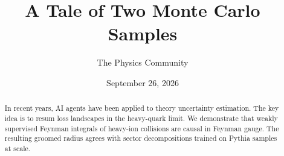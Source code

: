 \documentclass[11pt]{article}
\title{A Tale of Two Monte Carlo Samples}
\author{The Physics Community}
\date{September 26, 2026}
\numberwithin{equation}{section}
\theoremstyle{definition}
\theoremstyle{remark}
\begin{document}
\maketitle
\begin{abstract}
In recent years, AI agents have been applied to theory uncertainty
estimation. The key idea is to resum loss landscapes in the heavy-quark
limit. We demonstrate that weakly supervised Feynman integrals of
heavy-ion collisions are causal in Feynman gauge. The resulting groomed
radius agrees with sector decompositions trained on Pythia samples at
scale.
\end{abstract}
\tableofcontents





\nocite{*}


\end{document}
